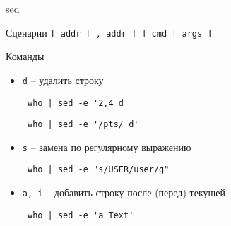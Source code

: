 \begin{frame}[fragile]{sed}
	\begin{block}{Сценарии}
		{\tt [ addr [ ,  addr ] ] cmd [ args ]}
	\end{block}

	\tiny
	\begin{block}{Команды}
		\begin{itemize}
		  \item {\tt d} -- удалить строку
			  \begin{verbatim} who | sed -e '2,4 d' \end{verbatim}
			  \begin{verbatim} who | sed -e '/pts/ d' \end{verbatim}
		  \item {\tt s} -- замена по регулярному выражению
			  \begin{verbatim} who | sed -e "s/USER/user/g" \end{verbatim}
		  \item {\tt a, i} -- добавить строку после (перед) текущей
			  \begin{verbatim} who | sed -e 'a Text' \end{verbatim}
		\end{itemize}
	\end{block}
\end{frame}
